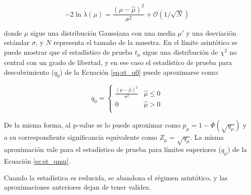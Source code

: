 \begin{equation}
	-2\ln{\lambda(\mu)}=\frac{(\mu-\hat{\mu})^{2}}{\sigma^{2}}+\mathcal{O}(1/\sqrt{N})
\end{equation}

\noindent
donde $\mu$ sigue una distribución Gaussiana con una media $\mu'$ y una desviación estándar $\sigma$, y $N$ representa el tamaño de la muestra. 
En el límite asintótico se puede mostrar que el estadístico de prueba $t_{\mu}$ sigue una distribución de $\chi^{2}$ no central con un grado de libertad, y en ese caso el estadístico de prueba para descubrimiento ($q_{0}$) de la Ecuación \ref{eq:st_q0} puede aproximarse como:

\begin{equation}
	q_{0}=
	\begin{cases}
		\frac{(\mu-\hat{\mu})^{2}}{\sigma^{2}} & \hat{\mu}\le 0 \\
		0 & \hat{\mu}>0 \\
	\end{cases}
\end{equation}

De la misma forma, al p-value se lo puede aproximar como $p_{\mu}=1-\Phi(\sqrt{q_{\mu}})$ y a su correspondiente significancia equivalente como $Z_{\mu}=\sqrt{q_{\mu}}$. La misma aproximación vale para el estadístico de prueba para límites superiores ($q_\mu$) de la Ecuación \ref{ec:st_qmu}.

Cuando la estadística es reducida, se abandona el régimen asintótico, y las aproximaciones anteriores dejan de tener validez.   %
 

